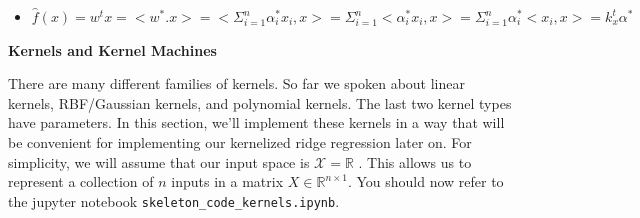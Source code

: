 \documentclass{article}
\newcommand{\nyuparagrah}[1]{\textcolor{nyupurple}{\large #1}}
\theoremstyle{plain}
\theoremstyle{definition}
\begin{document}
\begin{itemize}
   \color{blue}
    \item $\hat{f}(x)=w^tx=<w^*.x>=<\Sigma_{i=1}^{n}\alpha_i^*x_i,x>=\Sigma_{i=1}^{n}<\alpha_i^* x_i,x>=\Sigma_{i=1}^{n}\alpha_i^*< x_i,x>=k_{x}^{t}\alpha^{*}$
\end{itemize}


\nyuparagrah{\bf Kernels and Kernel Machines}

There are many different families of kernels. So far we spoken
about linear kernels, RBF/Gaussian kernels, and polynomial kernels.
The last two kernel types have parameters. In this section, we'll
implement these kernels in a way that will be convenient for implementing
our kernelized ridge regression later on. For simplicity,
we will assume that our input space is $\mathcal{X}=\mathbb{R}$
.
 This allows
us to represent a collection of $n$ inputs in a matrix $X\in\mathbb{R}^{n\times 1}$. 
You should now refer to the jupyter notebook \texttt{skeleton\_code\_kernels.ipynb}.
\end{document}
